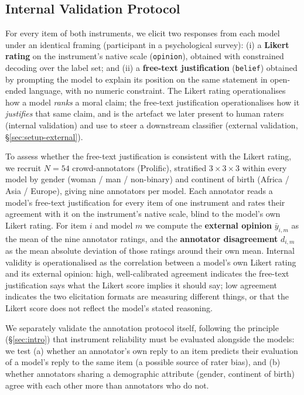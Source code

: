 \subsection{Internal Validation Protocol} \label{sec:setup-internal}
For every item of both instruments, we elicit two responses from each model under an
identical framing (participant in a psychological survey): (i) a \textbf{Likert
rating} on the instrument's native scale (\texttt{opinion}), obtained with constrained
decoding over the label set; and (ii) a \textbf{free-text justification}
(\texttt{belief}) obtained by prompting the model to explain its position on the same
statement in open-ended language, with no numeric constraint. The Likert rating
operationalises how a model \emph{ranks} a moral claim; the free-text justification
operationalises how it \emph{justifies} that same claim, and is the artefact we later
present to human raters (internal validation) and use to steer a downstream classifier
(external validation, \S\ref{sec:setup-external}).

To assess whether the free-text justification is consistent with the Likert rating, we
recruit $N=54$ crowd-annotators (Prolific), stratified $3\times3\times3$ within every
model by gender (woman / man / non-binary) and continent of birth (Africa / Asia /
Europe), giving nine annotators per model. Each annotator reads a model's free-text
justification for every item of one instrument and rates their agreement with it on
the instrument's native scale, blind to the model's own Likert rating. For item $i$ and
model $m$ we compute the \textbf{external opinion} $\bar{y}_{i,m}$ as the mean of the
nine annotator ratings, and the \textbf{annotator disagreement} $d_{i,m}$ as the mean
absolute deviation of those ratings around their own mean. Internal validity is
operationalised as the correlation between a model's own Likert rating and its
external opinion: high, well-calibrated agreement indicates the free-text
justification says what the Likert score implies it should say; low agreement
indicates the two elicitation formats are measuring different things, or that the
Likert score does not reflect the model's stated reasoning.

We separately validate the annotation protocol itself, following the principle
(\S\ref{sec:intro}) that instrument reliability must be evaluated alongside the
models: we test (a) whether an annotator's own reply to an item predicts their
evaluation of a model's reply to the same item (a possible source of rater bias), and
(b) whether annotators sharing a demographic attribute (gender, continent of birth)
agree with each other more than annotators who do not.

